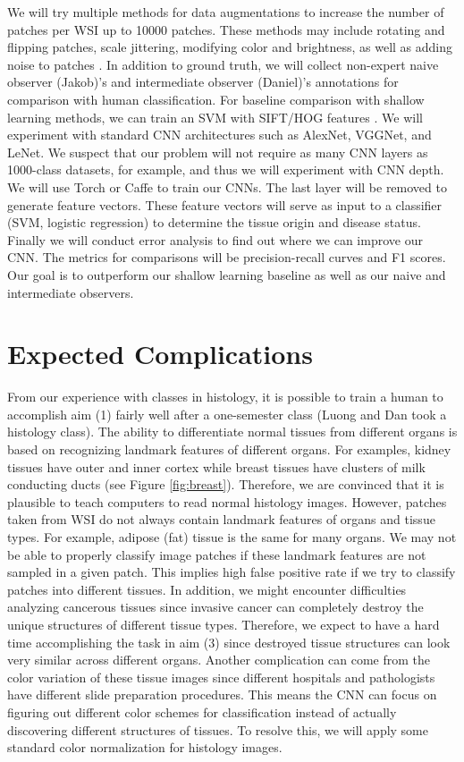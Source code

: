 \documentclass[10pt,twocolumn,letterpaper]{article}
\begin{document}
We will try multiple methods for data augmentations to increase the number of
patches per WSI up to 10000 patches. These methods may include rotating and
flipping patches, scale jittering, modifying color and brightness, as well as
adding noise to patches
\cite{eigen2015predicting}.
In addition to ground truth, we will collect
non-expert naive observer (Jakob)’s and intermediate observer (Daniel)’s
annotations for comparison with human classification. For baseline comparison
with shallow learning methods, we can train an SVM with SIFT/HOG features
\cite{chang2013classification}.
We will experiment with standard CNN architectures such as AlexNet, VGGNet,
and LeNet. We suspect that our problem will not require as many CNN layers
as 1000-class datasets, for example, and thus we will experiment with CNN
depth. We will use Torch or Caffe to train our CNNs. The last layer will be
removed to generate feature vectors. These feature vectors will serve as
input to a classifier (SVM, logistic regression) to determine the tissue
origin and disease status. Finally we will conduct error analysis to find
out where we can improve our CNN. The metrics for comparisons will be
precision-recall curves and F1 scores. Our goal is to outperform our shallow
learning baseline as well as our naive and intermediate observers.

\section{Expected Complications}
\label{sec:Expected Complications}

From our experience with classes in histology, it is possible to train a human
to accomplish aim (1) fairly well after a one-semester class (Luong and Dan
took a histology class). The ability to differentiate normal tissues from
different organs is based on recognizing landmark features of different
organs. For examples, kidney tissues have outer and inner cortex while breast
tissues have clusters of milk conducting ducts (see Figure \ref{fig:breast}).
Therefore, we are convinced that it is plausible to teach computers to read
normal histology images. However, patches taken from WSI do not always
contain landmark features of organs and tissue types. For example, adipose
(fat) tissue is the same for many organs. We may not be able to properly
classify image patches if these landmark features are not sampled in a given
patch. This implies high false positive rate if we try to classify patches
into different tissues. In addition, we might encounter difficulties analyzing
cancerous tissues since invasive cancer can completely destroy the unique
structures of different tissue types. Therefore, we expect to have a hard
time accomplishing the task in aim (3) since destroyed tissue structures can
look very similar across different organs. Another complication can come from
the color variation of these tissue images since different hospitals and
pathologists have different slide preparation procedures. This means the
CNN can focus on figuring out different color schemes for classification
instead of actually discovering different structures of tissues. To resolve
this, we will apply some standard color normalization for histology images.
\end{document}
